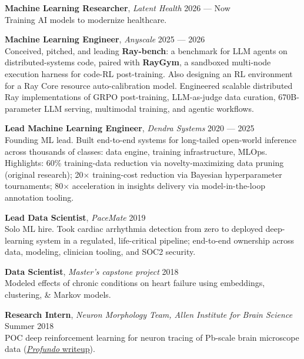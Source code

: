 \documentclass[a4paper,12pt]{article}
\begin{document}
    {\setlength{\parskip}{8pt}

    \textbf{Machine Learning Researcher}, \textit{Latent Health} \hfill 2026 --- Now \\
    Training AI models to modernize healthcare.

    \textbf{Machine Learning Engineer}, \textit{Anyscale} \hfill 2025 --- 2026 \\
    Conceived, pitched, and leading \textbf{Ray-bench}: a benchmark for LLM agents on distributed-systems code, paired with \textbf{RayGym}, a sandboxed multi-node execution harness for code-RL post-training. Also designing an RL environment for a Ray Core resource auto-calibration model. Engineered scalable distributed Ray implementations of GRPO post-training, LLM-as-judge data curation, 670B-parameter LLM serving, multimodal training, and agentic workflows.

    \textbf{Lead Machine Learning Engineer}, \textit{Dendra Systems} \hfill 2020 --- 2025 \\
    Founding ML lead. Built end-to-end systems for long-tailed open-world inference across thousands of classes: data engine, training infrastructure, MLOps. Highlights: 60\% training-data reduction via novelty-maximizing data pruning (original research); 20$\times$ training-cost reduction via Bayesian hyperparameter tournaments; 80$\times$ acceleration in insights delivery via model-in-the-loop annotation tooling.

    \textbf{Lead Data Scientist}, \textit{PaceMate} \hfill 2019 \\
    Solo ML hire. Took cardiac arrhythmia detection from zero to deployed deep-learning system in a regulated, life-critical pipeline; end-to-end ownership across data, modeling, clinician tooling, and SOC2 security.

    \textbf{Data Scientist}, \textit{Master's capstone project} \hfill 2018\\
    Modeled effects of chronic conditions on heart failure using embeddings, clustering, \& Markov models.

    \textbf{Research Intern}, \textit{Neuron Morphology Team, Allen Institute for Brain Science} \hfill Summer 2018\\
    POC deep reinforcement learning for neuron tracing of Pb-scale brain microscope data (\href{https://www.ricardodecal.com/projects/profundo-an-rl-agent-for-neural-cell-tracing/}{\textit{Profundo} writeup}).



}
\end{document}
